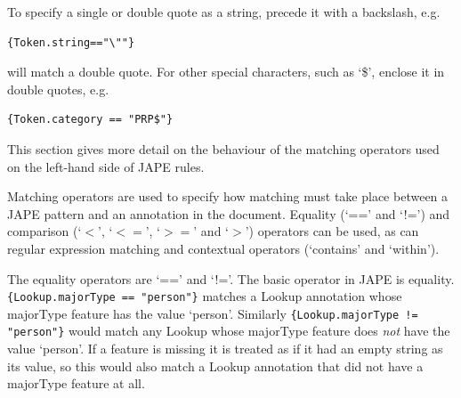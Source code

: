 To specify a single or double quote as a
string, precede it with a backslash, e.g.
\begin{small}
\begin{verbatim}
{Token.string=="\""}
\end{verbatim}
\end{small} will match a double quote.
For other special characters, such as `\$', enclose it in double quotes, e.g.
\begin{small}
\begin{verbatim}
{Token.category == "PRP$"}
\end{verbatim}
\end{small}

\label{sec:jape:matchingoperators}

This section gives more detail on the behaviour of the matching operators used
on the left-hand side of JAPE rules.

Matching operators are used to specify how matching must take place between a
JAPE pattern and an annotation in the document. Equality (`==' and `!=') and
comparison (`$<$', `$<=$', `$>=$' and `$>$') operators can be used, as can
regular expression matching and contextual operators (`contains' and `within').


The equality operators are `==' and `!='. The basic operator in JAPE is
equality. \verb|{Lookup.majorType == "person"}| matches a Lookup annotation whose
majorType feature has the value `person'. Similarly 
\verb|{Lookup.majorType != "person"}| would match any Lookup whose majorType
feature does \emph{not} have the value `person'.  If a feature is missing it is treated as if it had an
empty string as its value, so this would also match a Lookup annotation that did
not have a majorType feature at all.

